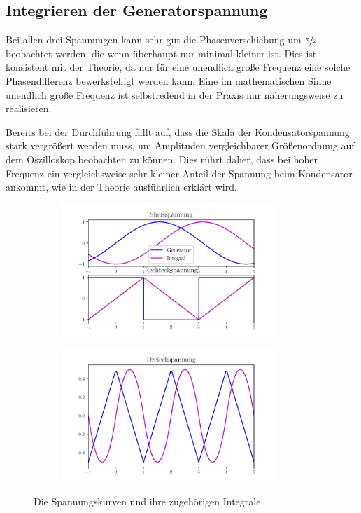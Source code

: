 \subsection{Integrieren der Generatorspannung}

Bei allen drei Spannungen kann sehr gut die Phasenverschiebung um $\sfrac{\pi}{2}$ beobachtet werden, die wenn überhaupt 
nur minimal kleiner ist. 
Dies ist konsistent mit der Theorie, da nur für eine unendlich große Frequenz eine solche Phasendifferenz bewerkstelligt 
werden kann. Eine im mathematischen Sinne unendlich große Frequenz ist selbstredend in der Praxis nur näherungsweise zu 
realisieren. 

Bereits bei der Durchführung fällt auf, dass die Skala der Kondensatorspannung stark vergrößert werden muss, um Amplituden 
vergleichbarer Größenordnung auf dem Oszilloskop beobachten zu können. 
Dies rührt daher, dass bei hoher Frequenz ein vergleichsweise sehr kleiner Anteil der Spannung beim Kondensator ankommt, 
wie in der Theorie ausführlich erklärt wird. 

\begin{figure}
\centering
\begin{subfigure}{0.48\textwidth}
    \centering
    \includegraphics[height=5cm]{plots/erwart_int1.pdf}
    \label{fig:erw1}
\end{subfigure}
\begin{subfigure}{0.48\textwidth}
    \centering
    \includegraphics[height=5cm]{plots/erwart_int2.pdf}
    \label{fig:erw2}
\end{subfigure}
\caption{Die Spannungskurven und ihre zugehörigen Integrale.}
\label{fig:int}
\end{figure}


